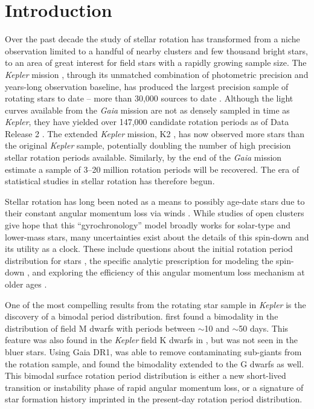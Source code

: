 \documentclass[trackchanges,preprint2]{aastex62}
\newcommand{\Kepler}{\textsl{Kepler}\xspace}
\begin{document}
\section{Introduction}
\label{sec:intro}

Over the past decade the study of stellar rotation has transformed from a niche observation limited to a handful of nearby clusters and few thousand bright stars, to an area of great  interest for field stars with a rapidly growing sample size.
The \Kepler mission \citep{borucki2010}, through its unmatched combination of photometric precision and years-long observation baseline, has produced the largest precision sample of rotating stars to date -- more than 30,000 sources to date \citep{nielsen2013,reinhold2013,mcquillan2014}. 
Although the light curves available from the {\em Gaia} mission are not as densely sampled in time as \Kepler \citep{gaia}, they have yielded over 147,000 candidate rotation periods as of Data Release 2 \citep{lanzafame2018}. 
The extended \Kepler mission, K2 \citep{howell2014}, has now observed more stars than the original \Kepler sample, potentially doubling the number of high precision stellar rotation periods available. 
Similarly, by the end of the {\em Gaia} mission \citet{lanzafame2018} estimate a sample of 3--20 million rotation periods will be recovered. The era of statistical studies in stellar rotation has therefore begun.

Stellar rotation has long been noted as a means to possibly age-date stars due to their constant angular momentum loss via winds \citep{skumanich1972}. 
While studies of open clusters give hope that this ``gyrochronology'' model broadly works for solar-type and lower-mass stars, many uncertainties exist about the details of this spin-down and its utility as a clock. These include questions about the initial rotation period distribution for stars \citep[e.g.][]{barnes2010,matt2015}, the specific analytic prescription for modeling the spin-down \citep{angus2015}, and exploring the efficiency of this angular momentum loss mechanism at older ages \citep{van-saders2016}.


One of the most compelling results from the rotating star sample in \Kepler is the discovery of a bimodal period distribution.
\citet{mcquillan2013} first found a bimodality in the distribution of field M dwarfs with periods between $\sim$10 and $\sim$50 days. This feature was also found in the \Kepler field K dwarfs in \citet{mcquillan2014}, but was not seen in the bluer stars. Using Gaia DR1, \citet{davenport2017} was able to remove contaminating sub-giants from the rotation sample, and found the bimodality extended to the G dwarfs as well. This bimodal surface rotation period distribution is either a new short-lived transition or instability phase of rapid angular momentum loss, or a signature of star formation history imprinted in the present-day rotation period distribution. 
\end{document}
